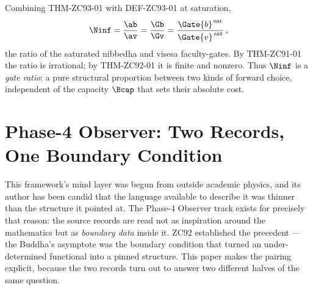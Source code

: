 \documentclass[12pt, a4paper]{article}
\begin{document}
\begin{formalbox}[title={COR-ZC93-01: Gate-Ratio Form of the Asymptotic
  Constant}]
Combining THM-ZC93-01 with DEF-ZC93-01 at saturation,
\[
  \Ninf=\frac{\ab}{\av}=\frac{\Gb}{\Gv}
       =\frac{\Gate{b}^{\,\mathrm{sat}}}{\Gate{v}^{\,\mathrm{sat}}}\,,
\]
the ratio of the saturated nibbedha and visesa faculty-gates. By
THM-ZC91-01 the ratio is irrational; by THM-ZC92-01 it is finite and nonzero.
Thus $\Ninf$ is a \emph{gate ratio}: a pure structural proportion between two
kinds of forward choice, independent of the capacity $\Bcap$ that sets their
absolute cost.
\end{formalbox}


\section{Phase-4 Observer: Two Records, One Boundary Condition}
\label{sec:phase4-zc93}

This framework's mind layer was begun from outside academic physics, and its
author has been candid that the language available to describe it was thinner
than the structure it pointed at. The Phase-4 Observer track exists for
precisely that reason: the source records are read not as inspiration around
the mathematics but as \emph{boundary data} inside it. ZC92 established the
precedent --- the Buddha's asymptote was the boundary condition that turned an
under-determined functional into a pinned structure. This paper makes the
pairing explicit, because the two records turn out to answer two different
halves of the same question.
\end{document}
